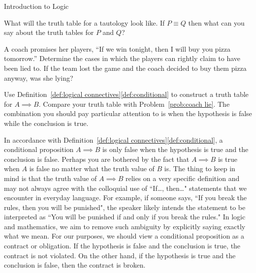 \begin{section}{Introduction to Logic}
\begin{problem}
  What will the truth table for a tautology look like. If $P \equiv Q$
  then what can you say about the truth tables for $P$ and $Q$?
\end{problem}

\begin{problem}\label{prob:coach lie}
  A coach promises her players, ``If we win tonight, then I will buy
  you pizza tomorrow.''  Determine the cases in which the players can
  rightly claim to have been lied to. If the team lost the game and
  the coach decided to buy them pizza anyway, was she lying?
\end{problem}

\begin{problem}
  Use Definition~\ref{def:logical connectives}\ref{def:conditional} to
  construct a truth table for $A \implies B$. Compare your truth table
  with Problem~\ref{prob:coach lie}. The combination you should pay
  particular attention to is when the hypothesis is false while the
  conclusion is true.
\end{problem}

In accordance with Definition~\ref{def:logical
  connectives}\ref{def:conditional}, a conditional proposition
$A\implies B$ is only false when the hypothesis is true and the
conclusion is false.  Perhaps you are bothered by the fact that
$A\implies B$ is true when $A$ is false no matter what the truth value
of $B$ is.  The thing to keep in mind is that the truth value of
$A\implies B$ relies on a very specific definition and may not always
agree with the colloquial use of ``If\ldots, then\ldots" statements
that we encounter in everyday language. For example, if someone says,
``If you break the rules, then you will be punished", the speaker
likely intends the statement to be interpreted as ``You will be
punished if and only if you break the rules." In logic and
mathematics, we aim to remove such ambiguity by explicitly saying
exactly what we mean. For our purposes, we should view a conditional
proposition as a contract or obligation.  If the hypothesis is false
and the conclusion is true, the contract is not violated. On the other
hand, if the hypothesis is true and the conclusion is false, then the
contract is broken.


\end{section}
